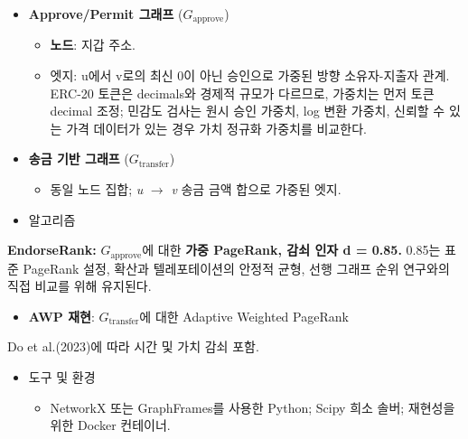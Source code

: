 \begin{itemize}
\item[\textbullet] \textbf{Approve/Permit 그래프 }($G_{\text{approve}}$)
\begin{itemize}
\item[\textendash] \textbf{노드}: 지갑 주소.
\item[\textendash] 엣지: u에서 v로의 최신 0이 아닌 승인으로 가중된 방향 소유자-지출자 관계. ERC-20 토큰은 decimals와 경제적 규모가 다르므로, 가중치는 먼저 토큰 decimal 조정; 민감도 검사는 원시 승인 가중치, log 변환 가중치, 신뢰할 수 있는 가격 데이터가 있는 경우 가치 정규화 가중치를 비교한다.
\end{itemize}
\item[\textbullet] \textbf{송금 기반 그래프 }($G_{\text{transfer}}$)
\begin{itemize}
\item[\textendash] 동일 노드 집합; \emph{u }\(\to\) \emph{v} 송금 금액 합으로 가중된 엣지.
\end{itemize}
\item[\textbullet] 알고리즘
\end{itemize}
\textbf{EndorseRank: }$G_{\text{approve}}$에 대한 \textbf{가중 PageRank, 감쇠 인자 d = 0.85.} 0.85는 표준 PageRank 설정, 확산과 텔레포테이션의 안정적 균형, 선행 그래프 순위 연구와의 직접 비교를 위해 유지된다.


\begin{itemize}
\item[\textendash] \textbf{AWP 재현}: $G_{\text{transfer}}$에 대한 Adaptive Weighted PageRank
\end{itemize}
Do et al.(2023)에 따라 시간 및 가치 감쇠 포함.


\begin{itemize}
\item[\textbullet] 도구 및 환경
\begin{itemize}
\item[\textendash] NetworkX 또는 GraphFrames를 사용한 Python; Scipy 희소 솔버; 재현성을 위한 Docker 컨테이너.
\end{itemize}
\end{itemize}

